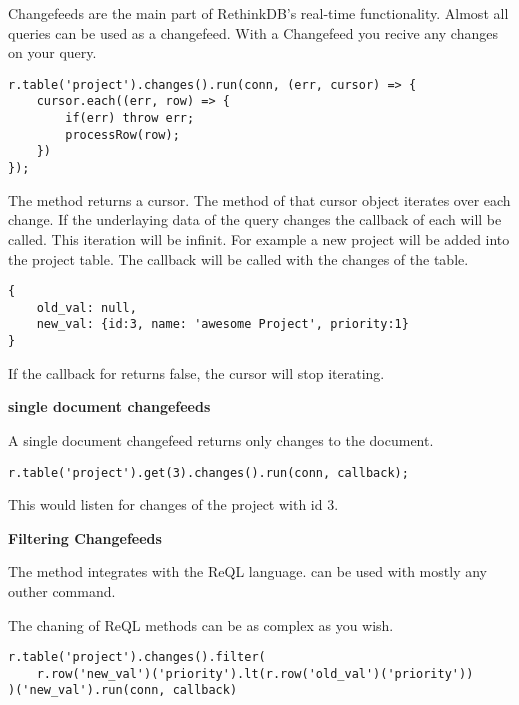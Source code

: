 Changefeeds are the main part of RethinkDB's real-time functionality.
Almost all queries can be used as a changefeed.
With a Changefeed you recive any changes on your query.

\begin{lstlisting}[frame=single, caption=example usage, label=refdoc]
r.table('project').changes().run(conn, (err, cursor) => {
	cursor.each((err, row) => {
		if(err) throw err;
		processRow(row);
	})
});
\end{lstlisting}

The  method returns a cursor.
The  method of that cursor object iterates over each change.
If the underlaying data of the query changes the callback of each will be called.
This iteration will be infinit.
For example a new project will be added  into the project table.
The  callback will be called with the changes of the table.

\begin{lstlisting}[frame=single, caption=example usage, label=refdoc]
{
	old_val: null,
	new_val: {id:3, name: 'awesome Project', priority:1}
}
\end{lstlisting}

If the callback for  returns false, the cursor will stop iterating.

\textbf{single document changefeeds}

A single document changefeed returns only changes to the document.

\begin{lstlisting}[frame=single, caption=example usage, label=refdoc]
r.table('project').get(3).changes().run(conn, callback);
\end{lstlisting}

This would listen for changes of the project with id 3.

\textbf{Filtering Changefeeds}

The method  integrates with the ReQL language.
 can be used with mostly any outher command.

The chaning of ReQL methods can be as complex as you wish.

\begin{lstlisting}[frame=single, caption=example usage, label=refdoc]
r.table('project').changes().filter(
    r.row('new_val')('priority').lt(r.row('old_val')('priority'))
)('new_val').run(conn, callback)
\end{lstlisting}

